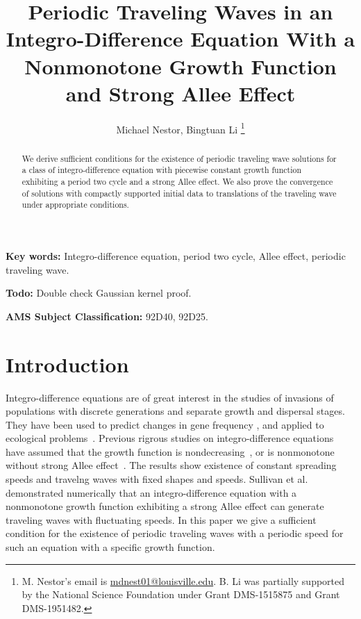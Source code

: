 \documentclass[11pt]{article}
\title{Periodic Traveling Waves in an Integro-Difference Equation With a Nonmonotone Growth Function and Strong Allee Effect}
\author{Michael Nestor, Bingtuan Li
\thanks{M. Nestor's email is \href{mailto:mdnest01@louisville.edu}{mdnest01@louisville.edu}. B. Li was partially supported by the National Science Foundation under Grant DMS-1515875 and Grant DMS-1951482.}}
\affil{Department of Mathematics, University of Louisville, \newline Louisville, KY 40292.}
\theoremstyle{definition}
\numberwithin{equation}{section}
\numberwithin{thm}{section}
\begin{document}
\maketitle


\begin{abstract}
We derive sufficient conditions for the existence of periodic traveling wave solutions for a class of integro-difference equation with piecewise constant growth function exhibiting a period two cycle and a strong Allee effect. We also prove the convergence of solutions with compactly supported initial data to translations of the traveling wave under appropriate conditions. 
\end{abstract}


{\bf Key words:} Integro-difference equation, period two cycle, Allee effect, periodic traveling wave.
\newline

{\bf Todo:} Double check Gaussian kernel proof.
\newline

{\bf AMS Subject Classification:} 92D40, 92D25.


\section{Introduction}

Integro-difference equations are of great interest in the studies of invasions of populations with discrete generations and separate growth and dispersal stages. They have been used to predict changes in gene frequency \cite{lui82a, lui82b, lui83, slatkin, w78}, and applied to ecological problems~\cite{hh, ks, kot89, kot92, kotbook, lut, nkl,otto}. Previous rigrous studies on integro-difference equations have assumed that the growth function is nondecreasing~\cite{w78, wein82}, or  is nonmonotone without strong Allee effect~\cite{lui83, wang}. The results show existence of constant spreading speeds and travelng waves with fixed shapes and speeds.   Sullivan et al. ~\cite{pnas} demonstrated numerically  that an integro-difference equation with a nonmonotone growth function exhibiting  a strong Allee effect can generate traveling waves with fluctuating speeds. In this paper we give a sufficient condition for the existence of periodic traveling waves with a periodic speed for such an equation with a specific growth function.
\end{document}
